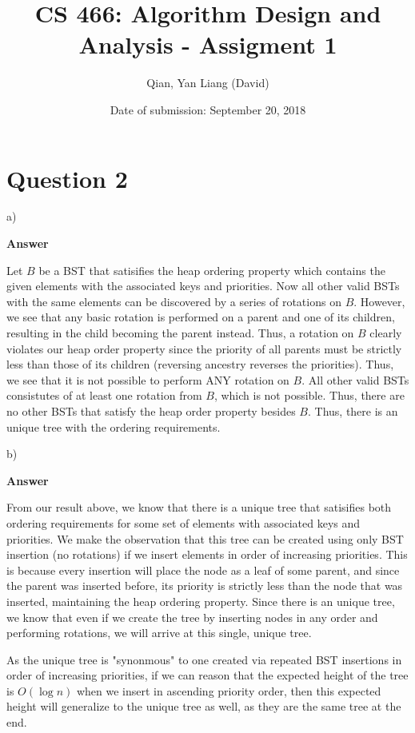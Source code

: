 \documentclass{article}
\title{CS 466: Algorithm Design and Analysis - Assigment 1}
\author{Qian, Yan Liang (David)}
\date{Date of submission: September 20, 2018}
\begin{document}
\newpage

\section{Question 2}

a)

\textbf{Answer}

Let $B$ be a BST that satisifies the heap ordering property which contains the given elements with the associated keys
and priorities. Now all other valid BSTs with the same elements can be discovered by a series of rotations on $B$.
However, we see that any basic rotation is performed on a parent and one of its children, resulting in the child
becoming the parent instead. Thus, a rotation on $B$ clearly violates our heap order property since the priority of all
parents must be strictly less than those of its children (reversing ancestry reverses the priorities). Thus, we see that
it is not possible to perform ANY rotation on $B$. All other valid BSTs consistutes of at least one rotation from $B$,
which is not possible. Thus, there are no other BSTs that satisfy the heap order property besides $B$. Thus, there is an
unique tree with the ordering requirements.


\newline

b)

\textbf{Answer}

From our result above, we know that there is a unique tree that satisifies both ordering requirements for some set of
elements with associated keys and priorities. We make the observation that this tree can be created using only BST
insertion (no rotations) if we insert elements in order of increasing priorities. This is because every insertion will place the node
as a leaf of some parent, and since the parent was inserted before, its priority is strictly less than the node that was
inserted, maintaining the heap ordering property. Since there is an unique tree, we know that even if we create the tree
by inserting nodes in any order and performing rotations, we will arrive at this single, unique tree.

As the unique tree is "synonmous" to one created via repeated BST insertions in order of increasing priorities, if we
can reason that the expected height of the tree is $O(\log n)$ when we insert in ascending priority order, then this
expected height will generalize to the unique tree as well, as they are the same tree at the end.
\end{document}
